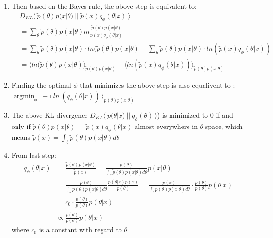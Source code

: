 \documentclass{article}
\begin{document}
\begin{enumerate}[Step 1:]
\item Then based on the Bayes rule, the above step is equivalent to: \\
\begin{equation}\nonumber 
\begin{aligned}
&{} D_{KL} \langle \ \tilde{p}(\theta) p(x|\theta) \  || \ \tilde{p}(x) q_\phi(\theta|x) \  \rangle  \\ 
&=\sum_{\theta} \tilde{p}(\theta) p(x|\theta) ln \frac{\tilde{p}(\theta) p(x|\theta)}{\tilde{p}(x) q_\phi(\theta|x)} \\
&=\sum_{\theta} \tilde{p}(\theta) p(x|\theta) \cdot  ln( \tilde{p}(\theta) p(x|\theta)  - \sum_{\theta} \tilde{p}(\theta) p(x|\theta) \cdot ln ( \tilde{p}(x) q_\phi(\theta|x) )\\
&= \langle ln( \tilde{p}(\theta) p(x|\theta)  \rangle_{\tilde{p}(\theta) p(x|\theta)} -  \langle  ln ( \tilde{p}(x) q_\phi(\theta|x) ) \rangle_{\tilde{p}(\theta) p(x|\theta)}
\end{aligned}
\end{equation}

\item Finding the optimal $\phi$ that minimizes the above step is also equalivent to : $\mathop{\arg\min}_{\phi}  \  -  \langle \ ln \  ( q_\phi(\theta|x) )\  \rangle_{\tilde{p}(\theta) p(x|\theta)}$

\item The above KL divergence $D_{KL} \langle \ p(\theta|x) \ || \ q_\phi(\theta) \ \rangle $) is minimized to 0 if and only if $\tilde{p}(\theta) p(x|\theta) \  = \tilde{p}(x) q_\phi(\theta|x) $ almost everywhere in $\theta$ space, which means $\tilde{p}(x) = \int_{\theta} \tilde{p}(\theta) p(x|\theta) d \theta $

\item From last step:
\begin{equation}\nonumber 
\begin{aligned}
 q_\phi(\theta|x) &= \frac{\tilde{p}(\theta) p(x|\theta)}{\tilde{p}(x) }
=  \frac{\tilde{p}(\theta) }{\int_{\theta} \tilde{p}(\theta) p(x|\theta) d \theta} p(x|\theta)\\
& =  \frac{\tilde{p}(\theta) }{\int_{\theta} \tilde{p}(\theta) p(x|\theta) d \theta} \frac{p(\theta|x) p(x) }{p(\theta)} = \frac{p(x) }{\int_{\theta} \tilde{p}(\theta) p(x|\theta) d \theta} \cdot \frac{\tilde{p}(\theta) }{p(\theta)}p(\theta|x) \\
& = c_0 \cdot \frac{\tilde{p}(\theta) }{p(\theta)}p(\theta|x)\\
& \propto \frac{\tilde{p}(\theta) }{p(\theta)}p(\theta|x)\
\end{aligned}
\end{equation}
where $c_0$ is a constant with regard to $\theta$


\end{enumerate}
\end{document}
